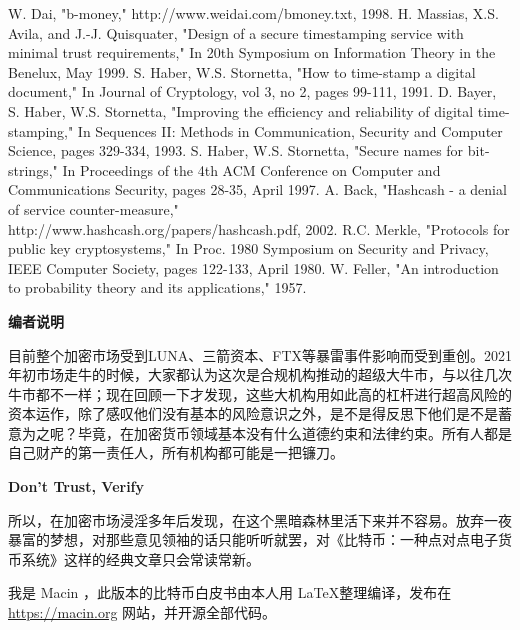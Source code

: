 \documentclass{ctexart}%
\begin{document}
\begin{thebibliography}{20}
W. Dai, "b-money," http://www.weidai.com/bmoney.txt, 1998.
H. Massias, X.S. Avila, and J.-J. Quisquater, "Design of a secure timestamping service with minimal trust requirements," In 20th Symposium on Information Theory in the Benelux, May 1999.
S. Haber, W.S. Stornetta, "How to time-stamp a digital document," In Journal of Cryptology, vol 3, no 2, pages 99-111, 1991.
D. Bayer, S. Haber, W.S. Stornetta, "Improving the efficiency and reliability of digital time-stamping," In Sequences II: Methods in Communication, Security and Computer Science, pages 329-334, 1993.
S. Haber, W.S. Stornetta, "Secure names for bit-strings," In Proceedings of the 4th ACM Conference on Computer and Communications Security, pages 28-35, April 1997.
A. Back, "Hashcash - a denial of service counter-measure,"\\ http://www.hashcash.org/papers/hashcash.pdf, 2002.
R.C. Merkle, "Protocols for public key cryptosystems," In Proc. 1980 Symposium on Security and Privacy, IEEE Computer Society, pages 122-133, April 1980.
W. Feller, "An introduction to probability theory and its applications," 1957.
\end{thebibliography}

\vspace{40pt}


\centerline{\textbf{编者说明}}
\vspace{10pt}
目前整个加密市场受到LUNA、三箭资本、FTX等暴雷事件影响而受到重创。2021年初市场走牛的时候，大家都认为这次是合规机构推动的超级大牛市，与以往几次牛市都不一样；现在回顾一下才发现，这些大机构用如此高的杠杆进行超高风险的资本运作，除了感叹他们没有基本的风险意识之外，是不是得反思下他们是不是蓄意为之呢？毕竟，在加密货币领域基本没有什么道德约束和法律约束。所有人都是自己财产的第一责任人，所有机构都可能是一把镰刀。

\textbf{Don't Trust, Verify}

所以，在加密市场浸淫多年后发现，在这个黑暗森林里活下来并不容易。放弃一夜暴富的梦想，对那些意见领袖的话只能听听就罢，对《比特币：一种点对点电子货币系统》这样的经典文章只会常读常新。

我是 Macin ，此版本的比特币白皮书由本人用 \LaTeX 整理编译，发布在 \url{https://macin.org} 网站，并开源全部代码。

\end{document}
